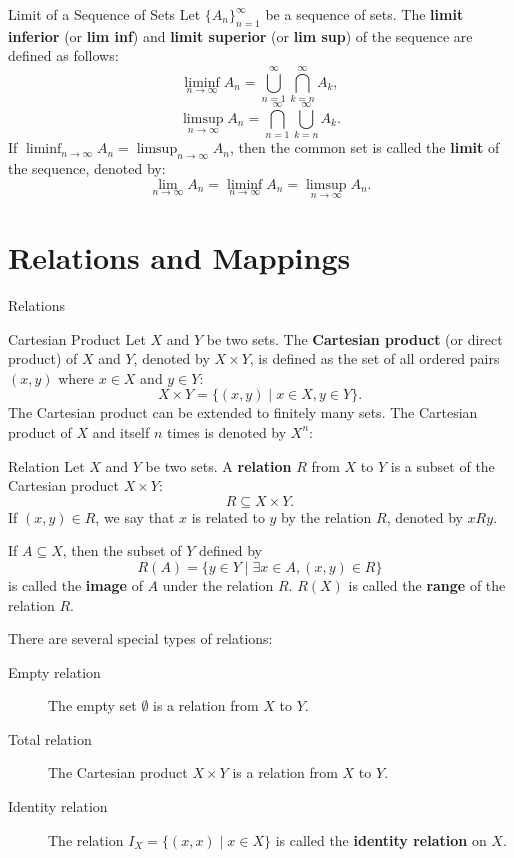 \begin{definition}{Limit of a Sequence of Sets} %
    Let \(\{A_n\}_{n=1}^{\infty}\) be a sequence of sets. 
    The \textbf{limit inferior} (or \textbf{lim inf}) and \textbf{limit superior} (or \textbf{lim sup}) of the sequence are defined as follows:
    \[
        \liminf_{n \to \infty} A_n = \bigcup_{n=1}^{\infty} \bigcap_{k=n}^{\infty} A_k,
    \]
    \[
        \limsup_{n \to \infty} A_n = \bigcap_{n=1}^{\infty} \bigcup_{k=n}^{\infty} A_k.
    \]
    If \(\liminf_{n \to \infty} A_n = \limsup_{n \to \infty} A_n\), 
    then the common set is called the \textbf{limit} of the sequence, denoted by:
    \[
        \lim_{n \to \infty} A_n = \liminf_{n \to \infty} A_n = \limsup_{n \to \infty} A_n.
    \]
\end{definition}



\section{Relations and Mappings} %
\begin{leftbarTitle}{Relations}\end{leftbarTitle}
\begin{definition}{Cartesian Product} %
    Let \(X\) and \(Y\) be two sets. 
    The \textbf{Cartesian product} (or direct product) of \(X\) and \(Y\), denoted by \(X \times Y\), 
    is defined as the set of all ordered pairs \((x, y)\) where \(x \in X\) and \(y \in Y\):
    \[
        X \times Y = \{(x, y) \mid x \in X, y \in Y\}.
    \]
    The Cartesian product can be extended to finitely many sets.
    \newline The Cartesian product of \(X\) and itself \(n\) times is denoted by \(X^n\):
\end{definition}

\begin{definition}{Relation} %
    Let \(X\) and \(Y\) be two sets. 
    A \textbf{relation} \(R\) from \(X\) to \(Y\) is a subset of the Cartesian product \(X \times Y\):
    \[
        R \subseteq X \times Y.
    \]
    If \((x, y) \in R\), we say that \(x\) is related to \(y\) by the relation \(R\), denoted by \(xRy\).

    If \(A \subseteq X\), then the subset of \(Y\) defined by
    \[
        R(A) = \{y \in Y \mid \exists x \in A, (x, y) \in R\}
    \]
    is called the \textbf{image} of \(A\) under the relation \(R\).
    \(R(X)\) is called the \textbf{range} of the relation \(R\).
\end{definition}
There are several special types of relations:
\begin{description}
    \item[Empty relation] The empty set \(\emptyset\) is a relation from \(X\) to \(Y\).
    \item[Total relation] The Cartesian product \(X \times Y\) is a relation from \(X\) to \(Y\).
    \item[Identity relation] The relation \(I_X = \{(x, x) \mid x \in X\}\) is called the \textbf{identity relation} on \(X\).
\end{description}


